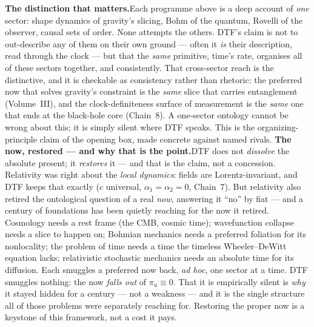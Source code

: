 \documentclass[11pt]{article}
\begin{document}
\smallskip
\noindent\textbf{The distinction that matters.}\enspace Each programme above is a deep account of
\emph{one} sector: shape dynamics of gravity's slicing, Bohm of the quantum, Rovelli of the observer,
causal sets of order. None attempts the others. DTF's claim is not to out-describe any of them on their own
ground --- often it \emph{is} their description, read through the clock --- but that the \emph{same}
primitive, time's rate, organises all of these sectors together, and consistently. That cross-sector reach
is the distinctive, and it is checkable as consistency rather than rhetoric: the preferred now that solves
gravity's constraint is the \emph{same} slice that carries entanglement (Volume~III), and the
clock-definiteness surface of measurement is the \emph{same} one that ends at the black-hole core (Chain~8).
A one-sector ontology cannot be wrong about this; it is simply silent where DTF speaks. This is the
organizing-principle claim of the opening box, made concrete against named rivals.
\smallskip
\noindent\textbf{The now, restored --- and why that is the point.}\enspace DTF does not \emph{dissolve} the
absolute present; it \emph{restores} it --- and that is the claim, not a concession. Relativity was right
about the \emph{local dynamics}: fields are Lorentz-invariant, and DTF keeps that exactly ($c$ universal,
$\alpha_1=\alpha_2=0$, Chain~7). But relativity also retired the ontological question of a real \emph{now},
answering it ``no'' by fiat --- and a century of foundations has been quietly reaching for the now it
retired. Cosmology needs a rest frame (the CMB, cosmic time); wavefunction collapse needs a slice to happen
on; Bohmian mechanics needs a preferred foliation for its nonlocality; the problem of time needs a time the
timeless Wheeler--DeWitt equation lacks; relativistic stochastic mechanics needs an absolute time for its
diffusion. Each smuggles a preferred now back, \emph{ad hoc}, one sector at a time. DTF smuggles nothing:
the now \emph{falls out} of $\pi_u\equiv0$. That it is empirically silent is \emph{why} it stayed hidden for
a century --- not a weakness --- and it is the single structure all of those problems were separately
reaching for. Restoring the proper now is a keystone of this framework, not a cost it pays.
\end{document}

